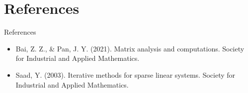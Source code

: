 \documentclass[t,usepdftitle=false]{beamer}
\begin{document}
\section{References}
\begin{frame}{References}
\begin{itemize}
\item Bai, Z. Z., \& Pan, J. Y. (2021). Matrix analysis and computations. Society for Industrial and Applied Mathematics.
\item Saad, Y. (2003). Iterative methods for sparse linear systems. Society for Industrial and Applied Mathematics.
\end{itemize}
\end{frame}
\end{document}
